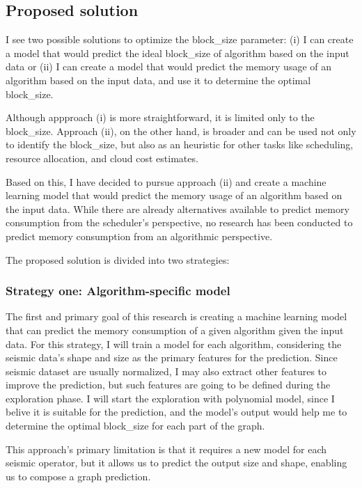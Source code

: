 \subsection{Proposed solution}
\label{subsec:proposed-solution}

I see two possible solutions to optimize the block\_size parameter:
(i) I can create a model that would predict the ideal block\_size of algorithm based on the input data or
(ii) I can create a model that would predict the memory usage of an algorithm based on the input data, and use it to determine the optimal block\_size.

Although appproach (i) is more straightforward, it is limited only to the block\_size.
Approach (ii), on the other hand, is broader and can be used not only to identify the block\_size, but also as an heuristic for other tasks like scheduling, resource allocation, and cloud cost estimates.

Based on this, I have decided to pursue approach (ii) and create a machine learning model that would predict the memory usage of an algorithm based on the input data. 
While there are already alternatives available to predict memory consumption from the scheduler's perspective, no research has been conducted to predict memory consumption from an algorithmic perspective.

The proposed solution is divided into two strategies:

\subsubsection{Strategy one: Algorithm-specific model}
\label{subsubsec:algorithm-specific-model}

The first and primary goal of this research is creating a machine learning model that can predict the memory consumption of a given algorithm given the input data.
For this strategy, I will train a model for each algorithm, considering the seismic data's shape and size as the primary features for the prediction.
Since seismic dataset are usually normalized, I may also extract other features to improve the prediction, but such features are going to be defined during the exploration phase.
I will start the exploration with polynomial model, since I belive it is suitable for the prediction, and the model's output would help me to determine the optimal block\_size for each part of the graph.

This approach's primary limitation is that it requires a new model for each seismic operator, but it allows us to predict the output size and shape, enabling us to compose a graph prediction.

